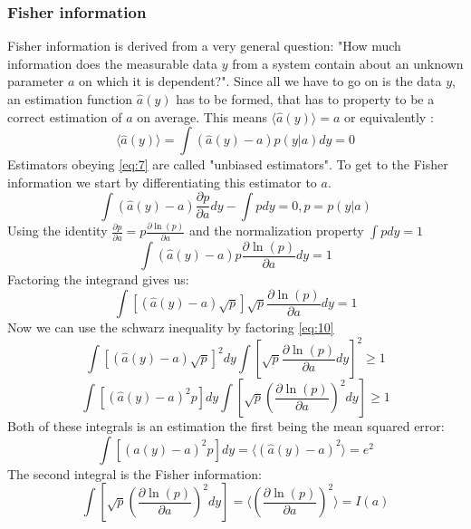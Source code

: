 \documentclass[a4paper]{article}
\begin{document}
\subsubsection{Fisher information}
Fisher information is derived from a very general question: "How much information does the measurable data $y$ from a system contain about an unknown parameter $a$ on which it is dependent?". Since all we have to go on is the data $y$, an estimation function $\hat{a} (y)$ has to be formed, that has to property to be a correct estimation of $a$ on average. This means $\langle \hat{a} (y) \rangle = a$ or equivalently \cite[p. ~9]{Fisher}:
\begin{equation} \label{eq:7}
\langle \hat{a} (y) \rangle = \int (\hat{a} (y) - a)p(y|a)dy = 0
\end{equation}
Estimators obeying \ref{eq:7} are called "unbiased estimators". To get to the Fisher information we start by differentiating this estimator to $a$. 
\begin{equation} \label{eq:8}
\int (\hat{a} (y) - a)\frac{\partial p}{\partial a}dy -\int pdy = 0, p = p(y|a)
\end{equation}
Using the identity $\frac{\partial p}{\partial a} = p\frac{\partial \ln(p)}{\partial a}$ and the normalization property $\int pdy = 1$
\begin{equation} \label{eq:9}
\int (\hat{a} (y) - a)p\frac{\partial \ln(p)}{\partial a}dy  = 1
\end{equation}
Factoring the integrand gives us:
\begin{equation} \label{eq:10}
\int [(\hat{a} (y) - a)\sqrt{p}]\sqrt{p}\frac{\partial \ln(p)}{\partial a}dy  = 1
\end{equation}
Now we can use the schwarz inequality by factoring \ref{eq:10}
\begin{equation} \label{eq:11}
\int [(\hat{a} (y) - a)\sqrt{p}]^2 dy \int[\sqrt{p}\frac{\partial \ln(p)}{\partial a}dy]^2  \geq 1
\end{equation}
\begin{equation} \label{eq:11}
\int [(\hat{a} (y) - a)^2 p] dy \int[\sqrt{p}(\frac{\partial \ln(p)}{\partial a})^2 dy]  \geq 1
\end{equation}
Both of these integrals is an estimation the first being the mean squared error:
\begin{equation}
\int [(\hat{a} (y) - a)^2p] dy = \langle (\hat{a} (y) - a)^2 \rangle = e^2
\end{equation}
The second integral is the Fisher information:
\begin{equation}
\int[\sqrt{p}(\frac{\partial \ln(p)}{\partial a})^2 dy] = \langle (\frac{\partial \ln(p)}{\partial a})^2 \rangle = I(a)
\end{equation}
\end{document}
